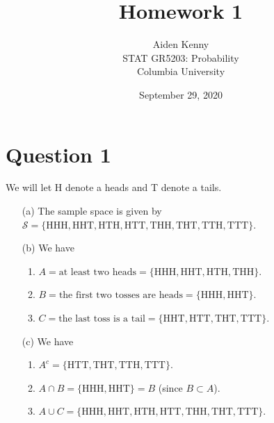 \documentclass[10pt]{article}
\title{
    {\Large Homework 1}
}
\author{
    {\normalsize Aiden Kenny}\\
    {\normalsize STAT GR5203: Probability}\\
    {\normalsize Columbia University}
}
\date{\normalsize September 29, 2020}
\begin{document}
\maketitle

\section{Question 1} \noindent
We will let H denote a heads and T denote a tails.
\begin{itemize}
    \item[(a)] The sample space is given by \(\mathcal{S} = \{\mathrm{HHH, HHT, HTH, HTT, THH, THT, TTH, TTT}\}\).
    \item[(b)] We have
    \begin{enumerate}
        \item \(A = \text{at least two heads} = \{\mathrm{HHH, HHT, HTH, THH}\}\).
        \item \(B = \text{the first two tosses are heads} = \{\mathrm{HHH, HHT}\}\).
        \item \(C = \text{the last toss is a tail} = \{\mathrm{HHT, HTT, THT, TTT}\}\).
    \end{enumerate}
    \item[(c)] We have 
    \begin{enumerate}
        \item \(A^c = \{\mathrm{HTT, THT, TTH, TTT}\}\).
        \item \(A \cap B = \{\mathrm{HHH, HHT}\} = B\) (since \(B \subset A\)).
        \item \(A \cup C = \{\mathrm{HHH, HHT, HTH, HTT, THH, THT, TTT}\}\).
    \end{enumerate}
\end{itemize}

\end{document}
